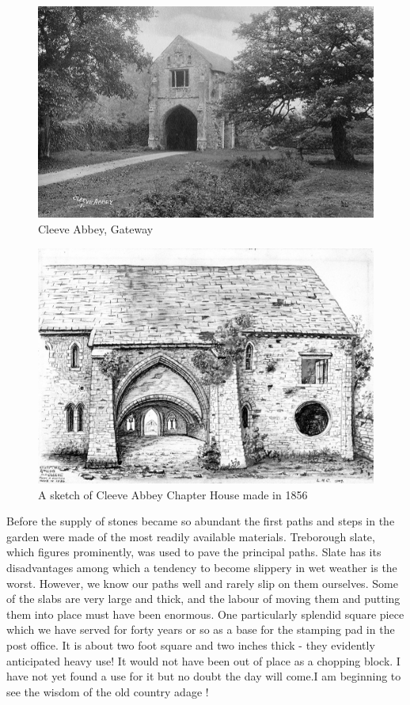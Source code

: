 \begin{figure}[p]
	\centering
     \includegraphics[width=1\textwidth]{figures/CleeveAbbey}
     \caption{Cleeve Abbey, Gateway}
     \label{fig:CleeveAbbey}
\end{figure}

\begin{figure}[p]
	\centering
     \includegraphics[width=1\textwidth]{figures/ChapterHouse}
     \caption{A sketch of Cleeve Abbey Chapter House made in 1856}
     \label{fig:ChapterHouse}
\end{figure}

\afterpage{\clearpage}

Before the supply of stones became so abundant the first paths and steps in the garden were made of the most readily available materials. Treborough slate, which figures prominently, was used to pave the principal paths. Slate has its disadvantages among which a tendency to become slippery in wet weather is the worst. However, we know our paths well and rarely slip on them ourselves. Some of the slabs are very large and thick, and the labour of moving them and putting them into place must have been enormous. One particularly splendid square piece which we have served for forty years or so as a base for the stamping pad in the post office. It is about two foot square and two inches thick - they evidently anticipated heavy use! It would not have been out of place as a chopping block. I have not yet found a use for it but no doubt the day will come.I am beginning to see the wisdom of the old country adage !

